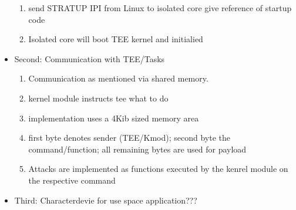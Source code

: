 \begin{itemize}
\begin{enumerate}
              \item send STRATUP IPI from Linux to isolated core give reference of startup code
              \item Isolated core will boot TEE kernel and initialied
          \end{enumerate}
    \item Second: Communication with TEE/Tasks
          \begin{enumerate}
              \item Communication as mentioned via shared memory.
              \item kernel module instructs tee what to do
              \item implementation uses a 4Kib sized memory area
              \item first byte denotes sender (TEE/Kmod); second byte the
                    command/function; all remaining bytes are used for payload
              \item Attacks are implemented as functions executed by the kenrel module on the respective command
          \end{enumerate}
    \item Third: Characterdevie for use space application???
\end{itemize}

